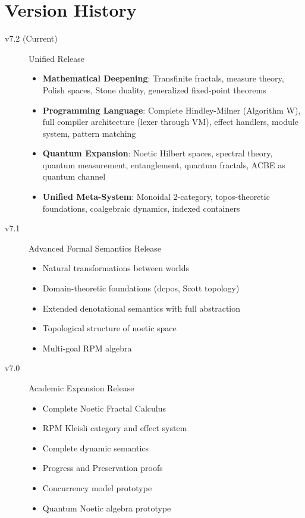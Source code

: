\documentclass[11pt,twoside,openright]{book}
\theoremstyle{definition}
\theoremstyle{plain}
\theoremstyle{remark}
\begin{document}

\chapter{Version History}
\label{app:versions}

\begin{description}
\item[v7.2 (Current)] Unified Release
  \begin{itemize}
  \item \textbf{Mathematical Deepening}: Transfinite fractals, measure theory, Polish spaces, Stone duality, generalized fixed-point theorems
  \item \textbf{Programming Language}: Complete Hindley-Milner (Algorithm W), full compiler architecture (lexer through VM), effect handlers, module system, pattern matching
  \item \textbf{Quantum Expansion}: Noetic Hilbert spaces, spectral theory, quantum measurement, entanglement, quantum fractals, ACBE as quantum channel
  \item \textbf{Unified Meta-System}: Monoidal 2-category, topos-theoretic foundations, coalgebraic dynamics, indexed containers
  \end{itemize}

\item[v7.1] Advanced Formal Semantics Release
  \begin{itemize}
  \item Natural transformations between worlds
  \item Domain-theoretic foundations (dcpos, Scott topology)
  \item Extended denotational semantics with full abstraction
  \item Topological structure of noetic space
  \item Multi-goal RPM algebra
  \end{itemize}

\item[v7.0] Academic Expansion Release
  \begin{itemize}
  \item Complete Noetic Fractal Calculus
  \item RPM Kleisli category and effect system
  \item Complete dynamic semantics
  \item Progress and Preservation proofs
  \item Concurrency model prototype
  \item Quantum Noetic algebra prototype
  \end{itemize}


\end{description}
\end{document}
